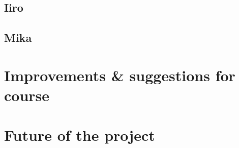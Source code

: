 \documentclass[
  oneside,
  11pt, a4paper,
  footinclude=true,
  headinclude=true,
  cleardoublepage=empty
]{scrbook}
\begin{document}
\section{Iiro}
\section{Mika}
\chapter{Improvements \& suggestions for course}
\chapter{Future of the project}
\end{document}
